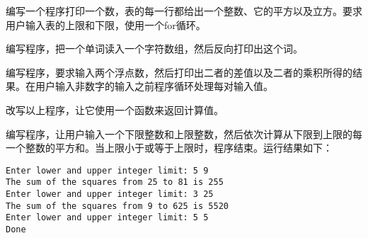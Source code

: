 \begin{frame}[fragile]
\begin{free}[问题5]{}
  编写一个程序打印一个数，表的每一行都给出一个整数、它的平方以及立方。要求用户输入表的上限和下限，使用一个for循环。
\end{free}
\end{frame}


\begin{frame}

\end{frame}


\begin{frame}[fragile]
\begin{free}[问题6]{}
  编写程序，把一个单词读入一个字符数组，然后反向打印出这个词。
\end{free}
\end{frame}


\begin{frame}

\end{frame}


\begin{frame}[fragile]
\begin{free}[问题7]{}
  编写程序，要求输入两个浮点数，然后打印出二者的差值以及二者的乘积所得的结果。在用户输入非数字的输入之前程序循环处理每对输入值。
\end{free}
\end{frame}


\begin{frame}

\end{frame}


\begin{frame}[fragile]
\begin{free}[问题8]{}
  改写以上程序，让它使用一个函数来返回计算值。
\end{free}
\end{frame}

\begin{frame}[fragile]
\begin{free}[问题9]{}
  编写程序，让用户输入一个下限整数和上限整数，然后依次计算从下限到上限的每一个整数的平方和。当上限小于或等于上限时，程序结束。运行结果如下：
\begin{lstlisting}
Enter lower and upper integer limit: 5 9
The sum of the squares from 25 to 81 is 255
Enter lower and upper integer limit: 3 25
The sum of the squares from 9 to 625 is 5520
Enter lower and upper integer limit: 5 5
Done
\end{lstlisting}
\end{free}
\end{frame}

